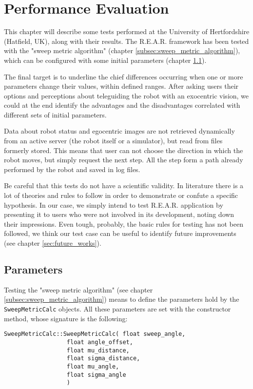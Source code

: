 \section{Performance Evaluation}
\label{sec:performance_evaluation}

This chapter will describe some tests performed at the University of Hertfordshire
(Hatfield, UK), along with their results. The R.E.A.R. framework has been tested with
the "sweep metric algorithm" (chapter \ref{subsec:sweep_metric_algorithm}), which can
be configured with some initial parameters (chapter \ref{subsec:parameters}).
%

%
The final target is to underline the chief differences occurring when one or more parameters
change their values, within defined ranges. After asking users their options and perceptions
about teleguiding the robot with an exocentric vision, we could at the end identify the advantages
and the disadvantages correlated with different sets of initial parameters.
%

%
Data about robot status and egocentric images are not retrieved dynamically from an active server (the
robot itself or a simulator), but read from files formerly stored. This means that user can not choose
the direction in which the robot moves, but simply request the next step. All the step form a path
already performed by the robot and saved in log files. 

%

%
Be careful that this tests do not have a scientific validity. In literature there is a lot of theories
and rules to follow in order to demonstrate or confute a specific hypothesis. In our case, we simply
intend to test R.E.A.R. application by presenting it to users who were not involved in its development,
noting down their impressions. Even tough, probably, the basic rules for testing has not been followed,
we think our test case can be useful to identify future improvements (see chapter \ref{sec:future_works}).

\subsection{Parameters}
\label{subsec:parameters}

Testing the "sweep metric algorithm" (see chapter \ref{subsec:sweep_metric_algorithm}) means to define
the parameters hold by the \texttt{SweepMetricCalc} objects. All these parameters are set with the
constructor method, whose signature is the following:
\\
%
\begin{verbatim}
SweepMetricCalc::SweepMetricCalc( float sweep_angle,
				  float angle_offset,
				  float mu_distance,
				  float sigma_distance,
				  float mu_angle,
				  float sigma_angle
				  )
\end{verbatim}
%


